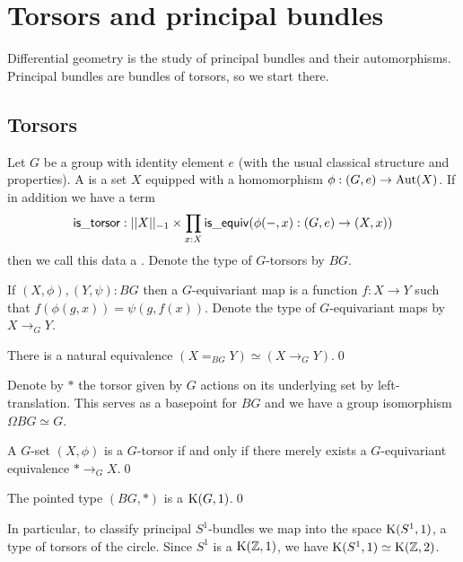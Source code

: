 \section{Torsors and principal bundles}
\label{sec:torsors}
Differential geometry is the study of principal bundles and their automorphisms. Principal bundles are bundles of torsors, so we start there.

\subsection{Torsors}

\begin{mydef}
Let \( G \) be a group with identity element \( e \) (with the usual classical structure and properties). A  is a set \( X \) equipped with a homomorphism \( \phi:(G,e)\to\operatorname{Aut}(X) \). If in addition we have a term
\[ 
\mathsf{is\_torsor}:||X||_{-1}\times \prod_{x:X}\mathsf{is\_equiv}(\phi(-,x):(G,e)\to (X,x))
\] then we call this data a . Denote the type of \( G \)-torsors by \( BG \).
\end{mydef}

If \( (X,\phi),(Y,\psi):BG \) then a \( G \)-equivariant map is a function \( f:X\to Y \) such that \( f(\phi(g,x))=\psi(g,f(x)) \). Denote the type of \( G \)-equivariant maps by \( X\to_G Y \).

\begin{mylemma}
There is a natural equivalence \( (X=_{BG}Y) \simeq (X\to_G Y) \).\qed
\end{mylemma}

Denote by \( * \) the torsor given by \( G \) actions on its underlying set by left-translation. This serves as a basepoint for \( BG \) and we have a group isomorphism \( \Omega BG\simeq G \).

\begin{mylemma}
A \( G \)-set \( (X,\phi) \) is a \( G \)-torsor if and only if there merely exists a \( G \)-equivariant equivalence \( *\to_G X \).\qed
\end{mylemma}

\begin{mycor}
The pointed type \( (BG,*) \) is a \( \mathrm{K}(G,1) \).\qed
\end{mycor}

In particular, to classify principal \( S^1 \)-bundles we map into the space \( \mathrm{K}(S^1, 1) \), a type of torsors of the circle. Since \( S^1 \) is a \( \mathrm{K}(\mathbb{Z},1) \), we have \( \mathrm{K}(S^1,1)\simeq\mathrm{K}(\mathbb{Z},2) \).

